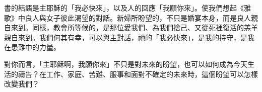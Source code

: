 書的結語是主耶穌的「我必快來」，以及人的回應「我願你來」。使我們想起《雅歌》中良人與女子彼此渴望的對話。新婦所盼望的，不只是婚宴本身，而是良人親自來到。同樣，教會所等候的，是那位愛我們、為我們捨己、又從死裡復活的羔羊親自來到。我們何其有幸，可以與主對話，祂的「我必快來」，是我的持守，是我在患難中的力量。

\begin{ReaderQuestion}
對你而言，「主耶穌啊，我願你來」不只是對未來的盼望，也可以如何成為今天生活的禱告？在工作、家庭、苦難、服事和面對不確定的未來時，這個盼望可以怎樣改變我們？
\end{ReaderQuestion}
